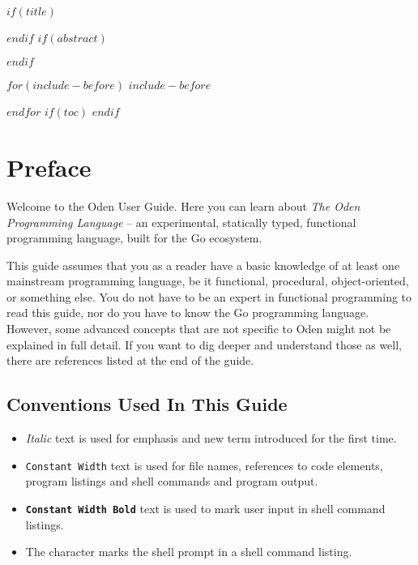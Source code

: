\documentclass[11pt,letterpaper]{book}
\title{\sffamily{\spaced{\Huge{\MakeUppercase{$title$}}$if(subtitle)$\\\vspace{0pt}{\large $subtitle$}$endif$}}}
\author{\textit{$for(author)$$author$$sep$ \and $endfor$}}
\date{$date$}
\begin{document}
\frontmatter
$if(title)$
\maketitle
$endif$
$if(abstract)$
\begin{abstract}
$abstract$
\end{abstract}
$endif$

$for(include-before)$
$include-before$

$endfor$
$if(toc)$
{
\hypersetup{linkcolor=black}
\setcounter{tocdepth}{$toc-depth$}
\tableofcontents
}
$endif$


\chapter{Preface}

Welcome to the Oden User Guide. Here you can learn about \textit{The Oden
Programming Language} -- an experimental, statically typed, functional
programming language, built for the Go ecosystem.

This guide assumes that you as a reader have a basic knowledge of at least one
mainstream programming language, be it functional, procedural,
object-oriented, or something else. You do not have to be an expert in
functional programming to read this guide, nor do you have to know the Go
programming language. However, some advanced concepts that are not specific to
Oden might not be explained in full detail. If you want to dig deeper and
understand those as well, there are references listed at the end of the guide.

\section{Conventions Used In This Guide}

\begin{itemize}
\item \textit{Italic} text is used for emphasis and new term introduced for the
  first time.
\item \texttt{Constant Width} text is used for file names, references to code
  elements, program listings and shell commands and program output.
\item \texttt{\textbf{Constant Width Bold}} text is used to mark user input in
  shell command listings.
\item The \texttt{\textdollar} character marks the shell prompt in a shell command
  listing.
\end{itemize}
\end{document}
